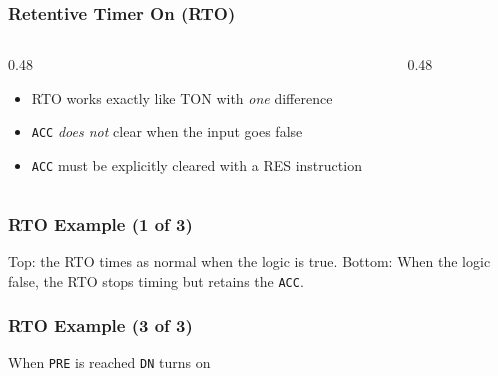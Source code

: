 \begin{frame}
    \frametitle{Retentive Timer On (RTO)}

    \begin{columns}
        \begin{column}{0.48\linewidth}
            \begin{itemize}
                \item RTO works exactly like TON with \emph{one} difference
                \item \texttt{ACC} \emph{does not} clear when the input goes false
                \item \texttt{ACC} must be explicitly cleared with a RES instruction
            \end{itemize}
        \end{column}
        \begin{column}{0.48\linewidth}
            \begin{figure}
                \centering
                
            \end{figure}
        \end{column}
    \end{columns}
\end{frame}

\begin{frame}
    \frametitle{RTO Example (1 of 3)}

    \begin{figure}
        \centering
        
    \end{figure}
    \begin{figure}
        \centering
        
    \end{figure}

    \vspace{0.5em}
    \centering
    {\footnotesize Top: the RTO times as normal when the logic is true. Bottom: When the logic false, the RTO stops timing but retains the \texttt{ACC}.\par}
\end{frame}

\begin{frame}
    \frametitle{RTO Example (3 of 3)}

    \begin{figure}
        \centering
        
    \end{figure}

    \vspace{0.5em}
    \centering
    {\footnotesize When \texttt{PRE} is reached \texttt{DN} turns on\par}
\end{frame}

